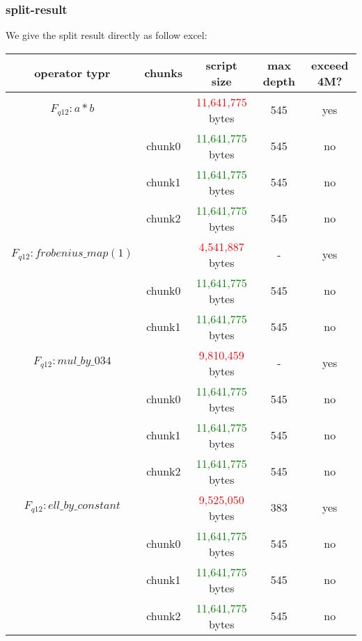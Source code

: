 \subsubsection{split-result}

We give the split result directly as follow excel:

\begin{center}
\begin{tabular}{|c|c|c|c|c|} \hline
    operator typr & chunks & script size & max depth & exceed 4M? \\ \hline
    $F_{q12}: a * b$ & & \textcolor{red}{11,641,775} bytes & 545 & yes \\ \hline
     & chunk0 & \textcolor{green}{11,641,775} bytes & 545 & no \\ \hline
     & chunk1 & \textcolor{green}{11,641,775} bytes & 545 & no \\ \hline
     & chunk2 & \textcolor{green}{11,641,775} bytes & 545 & no \\ \hline
    $F_{q12}: frobenius\_map(1)$ & & \textcolor{red}{4,541,887} bytes & - & yes \\ \hline
    & chunk0 & \textcolor{green}{11,641,775} bytes & 545 & no \\ \hline
    & chunk1 & \textcolor{green}{11,641,775} bytes & 545 & no \\ \hline
    $F_{q12}: mul\_by\_034$ & & \textcolor{red}{9,810,459} bytes & - & yes \\ \hline
    & chunk0 & \textcolor{green}{11,641,775} bytes & 545 & no \\ \hline
    & chunk1 & \textcolor{green}{11,641,775} bytes & 545 & no \\ \hline
    & chunk2 & \textcolor{green}{11,641,775} bytes & 545 & no \\ \hline
    $F_{q12}: ell\_by\_constant$ & & \textcolor{red}{9,525,050} bytes & 383 & yes \\ \hline
    & chunk0 & \textcolor{green}{11,641,775} bytes & 545 & no \\ \hline
    & chunk1 & \textcolor{green}{11,641,775} bytes & 545 & no \\ \hline
    & chunk2 & \textcolor{green}{11,641,775} bytes & 545 & no \\ \hline
\end{tabular}
\end{center}
